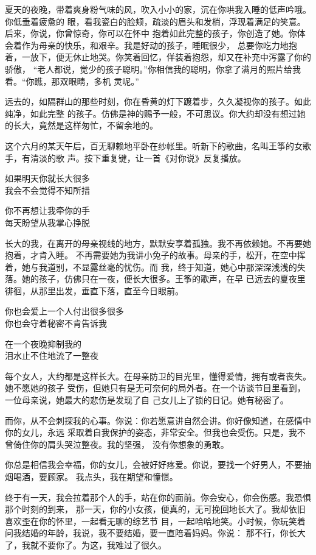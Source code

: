 		夏天的夜晚，带着爽身粉气味的风，吹入小小的家，沉在你哄我入睡的低声吟哦。你低垂着疲惫的
	眼，看我瓷白的脸颊，疏淡的眉头和发梢，浮现着满足的笑意。后来，你说，你曾惊奇，你可以在怀中
	抱着如此完整的孩子，你创造了她。你体会着作为母亲的快乐，和艰辛。我是好动的孩子，睡眠很少，
	总要你吃力地抱着，一放下，便无休止地哭。你笑着回忆，佯装着抱怨，却又在补充中泻露了你的骄傲，
	“老人都说，觉少的孩子聪明。”你相信我的聪明，你拿了满月的照片给我看。“你瞧，那双眼睛，多机
	灵呢。”

		远去的，如隔群山的那些时刻，你在昏黄的灯下踱着步，久久凝视你的孩子。如此纯净，如此完整
	的孩子。仿佛是神的赐予一般，不可思议。你大约却没有想过她的长大，竟然是这样匆忙，不留余地的。

		这个六月的某天午后，百无聊赖地平卧在纱帐里。听新下的歌曲，名叫王筝的女歌手，有清淡的歌
	声。按下重复键，让一首《对你说》反复播放。

		\longpoem{}{}{}
			如果明天你就长大很多 \\
			我会不会觉得不知所措

			你不再想让我牵你的手 \\
			每天盼望从我掌心挣脱
		\endlongpoem

		长大的我，在离开的母亲视线的地方，默默安享着孤独。我不再依赖她。不再要她抱着，才肯入睡。
	不再需要她为我讲小兔子的故事。母亲的手，松开，在空中挥着，她与我道别，不显露丝毫的忧伤。而
	我，终于知道，她心中那深深浅浅的失落。她的孩子，仿佛只在一夜，便长大很多。王筝的歌声，在早
	已远去的夏夜里徘徊，从那里出发，垂直下落，直至今日眼前。

		\longpoem{}{}{}
			你也会爱上一个人付出很多很多 \\
			你也会守着秘密不肯告诉我

			在一个夜晚抑制我的 \\
			泪水止不住地流了一整夜
		\endlongpoem

		每个女人，大约都是这样长大。在母亲防卫的目光里，懂得爱情，拥有或者丧失。她不愿她的孩子
	受伤，但她只有是无可奈何的局外者。在一个访谈节目里看到，一位母亲说，她最大的悲伤是发现了自
	己女儿上了锁的日记。她有秘密了。

		而你，从不会刺探我的心事。你说：你若愿意讲自然会讲。你好像知道，在感情中你的女儿，永远
	采取着自我保护的姿态，非常安全。但我也会受伤。只是，我不曾倚住你的肩头哭泣整夜。我的坚强，
	没有你想象的勇敢。

		你总是相信我会幸福，你的女儿，会被好好疼爱。你说，要找一个好男人，不要抽烟喝酒，要顾家。
	我点头，我在期望和憧憬。

		终于有一天，我会拉着那个人的手，站在你的面前。你会安心，你会伤感。我恐惧那个时刻的到来，
	那一天，你的小女孩，便真的，无可挽回地长大了。我却依旧喜欢歪在你的怀里，一起看无聊的综艺节
	目，一起哈哈地笑。小时候，你玩笑着问我结婚的年龄，我说，我不要结婚，要一直陪着妈妈。你说：
	那不行，你长大了，我就不要你了。为这，我难过了很久。

